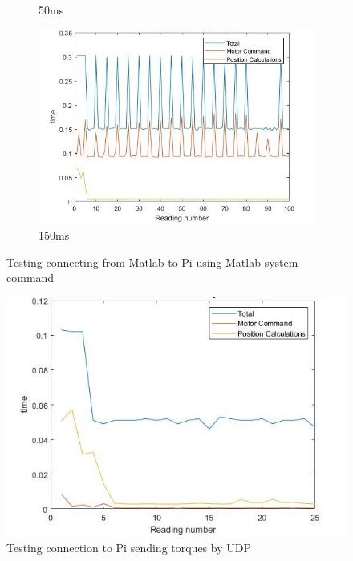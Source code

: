 \documentclass[twoside,twocolumn,12pt]{article}
\begin{document}
\begin{figure}[t]
\begin{subfigure}[t]{0.325\textwidth}
    \caption{50ms}
  \label{fig:pi50}
  \end{subfigure}
  \begin{subfigure}[t]{0.325\textwidth}
    \includegraphics[width=\linewidth]{150ms_pi}
    \caption{150ms}
  \label{fig:pi150}
  \end{subfigure}
  \caption{Testing connecting from Matlab to Pi using Matlab system command}
  \label{fig:pi}
\end{figure}

\begin{figure}
  \centering
    \includegraphics[width=\linewidth]{50ms_udp}
  \caption{Testing connection to Pi sending torques by UDP}
  \label{fig:piudp}
\end{figure} 
  
\end{document}
